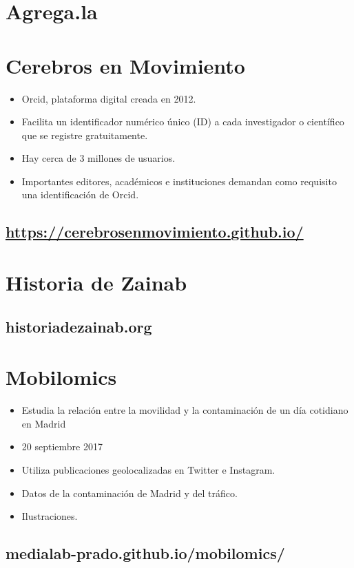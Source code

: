 \documentclass[11pt]{article}
\begin{document}
\section*{Agrega.la}
\label{sec:org3658797}
\section*{Cerebros en Movimiento}
\label{sec:org2e958ef}
\begin{itemize}
\item Orcid, plataforma digital creada en 2012.
\item Facilita un identificador numérico único (ID) a cada investigador o científico que se registre gratuitamente.
\item Hay cerca de 3 millones de usuarios.
\item Importantes editores, académicos e instituciones demandan como requisito una identificación de Orcid.
\end{itemize}
\subsection*{\url{https://cerebrosenmovimiento.github.io/}}
\label{sec:org4092811}
\section*{Historia de Zainab}
\label{sec:orgbcdf5c9}

\subsection*{historiadezainab.org}
\label{sec:orge95c2ad}

\section*{Mobilomics}
\label{sec:org2cbb479}
\begin{itemize}
\item Estudia la relación entre la movilidad y la contaminación de un día cotidiano en Madrid
\item 20 septiembre 2017
\item Utiliza publicaciones geolocalizadas en Twitter e Instagram.
\item Datos de la contaminación de Madrid y del tráfico.
\item Ilustraciones.
\end{itemize}

\subsection*{medialab-prado.github.io/mobilomics/}
\label{sec:org5d9422b}
\end{document}
